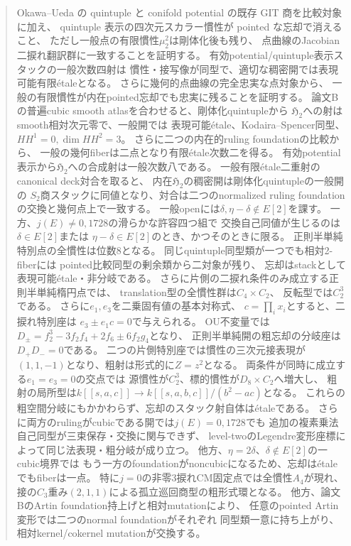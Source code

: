 \documentclass[a4paper,11pt]{ltjsarticle}
\numberwithin{equation}{section}
\theoremstyle{plain}
\theoremstyle{definition}
\theoremstyle{remark}
\newcommand{\HHstack}{\mathfrak H_2}
\begin{document}
\begin{abstract}
Okawa--Ueda の quintuple と conifold potential の既存 GIT 商を比較対象に加え、
quintuple 表示の四次元スカラー慣性が pointed な忘却で消えること、
ただし一般点の有限慣性$\mu_2^2$は剛体化後も残り、
点曲線のJacobian二捩れ翻訳群に一致することを証明する。
有効potential/quintuple表示スタックの一般次数四射は
慣性・接写像が同型で、適切な稠密開では表現可能有限étaleとなる。
さらに幾何的点曲線の完全忠実な点対象から、
一般の有限慣性が内在pointed忘却でも忠実に残ることを証明する。
論文Bの普遍cubic smooth atlasを合わせると、剛体化quintupleから
$\HHstack$への射はsmooth相対次元零で、一般開では
表現可能étale、Kodaira--Spencer同型、$HH^1=0,\dim HH^2=3$。
さらに二つの内在的ruling foundationの比較から、
一般の幾何fiberは二点となり有限étale次数二を得る。
有効potential表示から$\HHstack$への合成射は一般次数八である。
一般有限étale二重射のcanonical deck対合を取ると、
内在$\HHstack$の稠密開は剛体化quintupleの一般開の
$S_2$商スタックに同値となり、対合は二つのnormalized
ruling foundationの交換と幾何点上で一致する。
一般openには$\delta,\eta-\delta\notin E[2]$を課す。
一方、$j(E)\ne0,1728$の滑らかな許容四つ組で
交換自己同値が生じるのは$\delta\in E[2]$または
$\eta-\delta\in E[2]$のとき、かつそのときに限る。
正則半単純特別点の全慣性は位数8となる。
同じquintuple同型類が一つでも相対2-fiberには
pointed比較同型の剰余類から二対象が残り、
忘却はstackとして表現可能étale・非分岐である。
さらに片側の二捩れ条件のみ成立する正則半単純楕円点では、
translation型の全慣性群は$C_4\times C_2$、
反転型では$C_2^3$である。
さらに$e_1,e_3$を二乗固有値の基本対称式、
$c=\prod_i x_i$とすると、二捩れ特別座は
$e_3\pm e_1c=0$で与えられる。
OU不変量では$D_\pm=f_2^3-3f_2f_4+2f_6\pm6f_2g_4$となり、
正則半単純開の粗忘却の分岐座は$D_+D_-=0$である。
二つの片側特別座では慣性の三次元接表現が
$(1,1,-1)$となり、粗射は形式的に$Z=z^2$となる。
両条件が同時に成立する$e_1=e_3=0$の交点では
源慣性が$C_2^3$、標的慣性が$D_8\times C_2$へ増大し、
粗射の局所型は$k[[s,a,c]]\to k[[s,a,b,c]]/(b^2-ac)$となる。
これらの粗空間分岐にもかかわらず、忘却のスタック射自体はétaleである。
さらに両方のrulingがcubicである開では$j(E)=0,1728$でも
追加の複素乗法自己同型が三束保存・交換に関与できず、
level-twoのLegendre変形座標によって同じ法表現・粗分岐が成り立つ。
他方、$\eta=2\delta$、$\delta\notin E[2]$の一cubic境界では
もう一方のfoundationがnoncubicになるため、忘却はétaleでもfiberは一点。
特に$j=0$の非零3捩れCM固定点では全慣性$A_4$が現れ、
接の$C_3$重み$(2,1,1)$による孤立巡回商型の粗形式環となる。
他方、論文BのArtin foundation持上げと相対mutationにより、
任意のpointed Artin変形では二つのnormal foundationがそれぞれ
同型類一意に持ち上がり、相対kernel/cokernel mutationが交換する。

\end{abstract}
\end{document}
